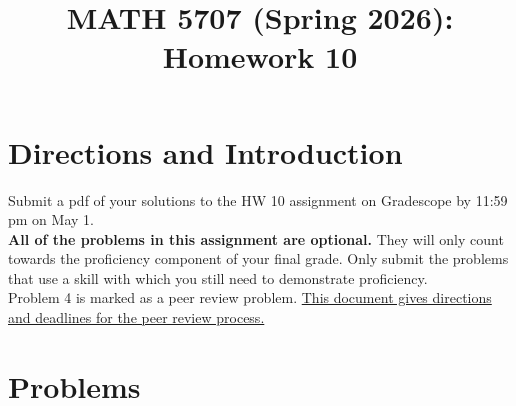 \documentclass[12pt]{article}
\title{MATH 5707 (Spring 2026): Homework 10}
\date{}
\begin{document}
\vspace{-0.7in}

\maketitle
\vspace{-0.6in}


\section*{Directions and Introduction}
Submit a pdf of your solutions to the HW 10 assignment on Gradescope by 11:59 pm on May 1.
\\[5pt]
\textbf{All of the problems in this assignment are optional. } They will only count towards the proficiency component of your final grade. Only submit the problems that use a skill  with which you still need to demonstrate proficiency.
\\[5pt]
Problem 4 is marked as a peer review problem. \href{https://docs.google.com/document/d/1jSw9pmMJJFUx_6dTkcUi4k4HJNIrrIIgs9zdWhAycx0/edit?usp=sharing}{This document gives directions and deadlines for the peer review process.}



\section*{Problems}
\end{document}
